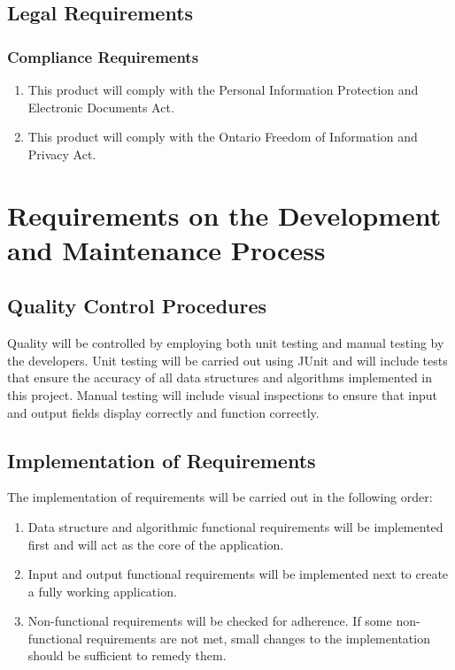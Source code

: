 \documentclass[english]{article}
\begin{document}

\subsection{Legal Requirements}
\label{sub:legal_requirements}

\subsubsection{Compliance Requirements}
\label{ssub:compliance_requirements}
\begin{enumerate}[{LCR}1. ]
\item This product will comply with the Personal Information Protection and Electronic Documents Act.
	\item This product will comply with the Ontario Freedom of Information and Privacy Act.
\end{enumerate}


\section{Requirements on the Development and Maintenance Process}
\label{sec:req_on_dev_and_maint}
\subsection{Quality Control Procedures}
Quality will be controlled by employing both unit testing and manual testing by the developers.  Unit testing will be carried out using JUnit and will include tests that ensure the accuracy of all data structures and algorithms implemented in this project.  Manual testing will include visual inspections to ensure that input and output fields display correctly and function correctly.

\subsection{Implementation of Requirements}
The implementation of requirements will be carried out in the following order:

\begin{enumerate}
\item Data structure and algorithmic functional requirements will be implemented first and will act as the core of the application.
\item Input and output functional requirements will be implemented next to create a fully working application.
\item Non-functional requirements will be checked for adherence.  If some non-functional requirements are not met, small changes to the implementation should be sufficient to remedy them.
\end{enumerate}
\end{document}
